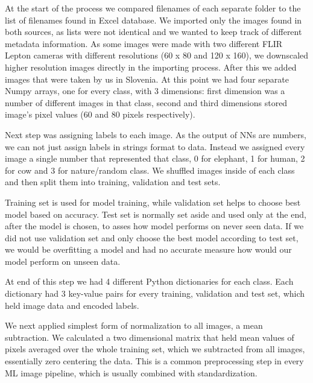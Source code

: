 At the start of the process we compared filenames of each separate folder to the list of filenames found in Excel database.
We imported only the images found in both sources, as lists were not identical and we wanted to keep track of different metadata information.
As some images were made with two different FLIR Lepton cameras with different resolutions (60 x 80 and 120 x 160), we downscaled higher resolution images directly in the importing process.
After this we added images that were taken by us in Slovenia.
At this point we had four separate Numpy arrays, one for every class, with 3 dimensions: first dimension was a number of different images in that class, second and third dimensions stored image's pixel values (60 and 80 pixels respectively).

Next step was assigning labels to each image.
As the output of NNs are numbers, we can not just assign labels in strings format to data.
Instead we assigned every image a single number that represented that class, 0 for elephant, 1 for human, 2 for cow and 3 for nature/random class.
We shuffled images inside of each class and then split them into training, validation and test sets.

Training set is used for model training, while validation set helps to choose best model based on accuracy.
Test set is normally set aside and used only at the end, after the model is chosen, to asses how model performs on never seen data.
If we did not use validation set and only choose the best model according to test set, we would be overfitting a model and had no accurate measure how would our model perform on unseen data.

At end of this step we had 4 different Python dictionaries for each class.
Each dictionary had 3 key-value pairs for every training, validation and test set, which held image data and encoded labels.

We next applied simplest form of normalization to all images, a mean subtraction.
We calculated a two dimensional matrix that held mean values of pixels averaged over the whole training set, which we subtracted from all images, essentially zero centering the data.
This is a common preprocessing step in every ML image pipeline, which is usually combined with standardization\footnotemark.


